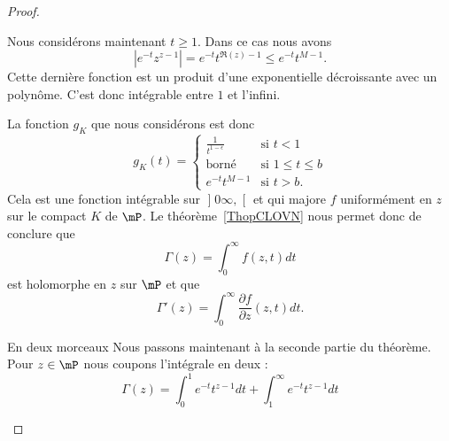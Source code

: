 \begin{proof}
\begin{subproof}
			Nous considérons maintenant \( t\geq 1\). Dans ce cas nous avons
			\begin{equation}
				|  e^{-t}z^{z-1} |= e^{-t}t^{\Re(z)-1}\leq  e^{-t}t^{M-1}.
			\end{equation}
			Cette dernière fonction est un produit d'une exponentielle décroissante avec un polynôme. C'est donc intégrable entre \( 1\) et l'infini.

			La fonction \( g_K\) que nous considérons est donc
			\begin{equation}
				g_K(t)=\begin{cases}
					\frac{1}{ t^{1-\epsilon} } & \text{si } t<1           \\
					\text{borné}               & \text{si } 1\leq t\leq b \\
					e^{-t}t^{M-1}              & \text{si } t>b.
				\end{cases}
			\end{equation}
			Cela est une fonction intégrable sur \( \mathopen] 0    \infty ,  \mathclose[\) et qui majore \( f\) uniformément en \( z\) sur le compact \( K\) de \( \mP\). Le théorème~\ref{ThopCLOVN} nous permet donc de conclure que
		\begin{equation}
			\Gamma(z)=\int_0^{\infty}f(z,t)dt
		\end{equation}
		est holomorphe en \( z\) sur \( \mP\) et que
		\begin{equation}
			\Gamma'(z)=\int_0^{\infty}\frac{ \partial f }{ \partial z }(z,t)dt.
		\end{equation}

		\item[En deux morceaux] Nous passons maintenant à la seconde partie du théorème. Pour \( z\in \mP\) nous coupons l'intégrale en deux :
		\begin{equation}
			\Gamma(z)=\int_0^1 e^{-t}t^{z-1}dt+\int_1^{\infty} e^{-t}t^{z-1}dt
		\end{equation}


\end{subproof}
\end{proof}
